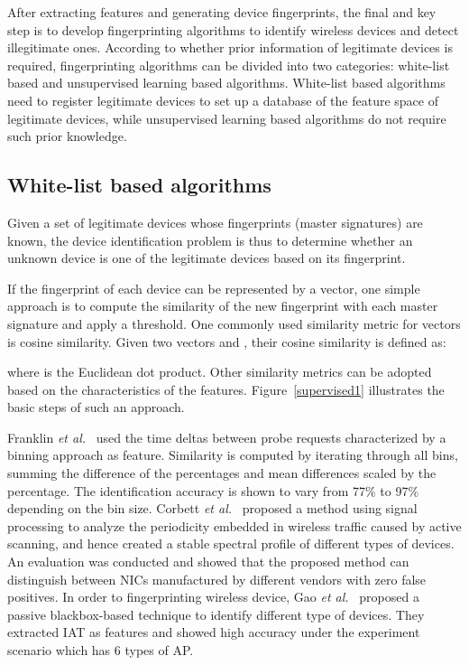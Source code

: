 \documentclass[journal,draftcls,onecolumn,11pt]{IEEEtran}
\newcounter{ctr}\setcounter{ctr}{0}
\begin{document}
After extracting features and generating device fingerprints, the final and key step is to develop fingerprinting algorithms to identify wireless devices and detect illegitimate ones.  According to whether prior information of legitimate devices is required, fingerprinting algorithms can be divided into two categories: white-list based  and unsupervised learning based algorithms.  White-list based algorithms need to register legitimate devices to set up a database of the feature space of legitimate devices, while unsupervised learning based algorithms do not require such prior knowledge.

\subsection{White-list based algorithms}

Given a set of legitimate devices whose fingerprints (master signatures) are known, the device identification problem is thus to determine whether an unknown device is one of the legitimate devices based on its fingerprint.

If the fingerprint of each device can be represented by a vector, one simple approach is to compute the similarity of the new fingerprint with each master signature and apply a threshold. One commonly used similarity metric for vectors is cosine similarity.  Given two vectors  and , their cosine similarity is defined as:

where  is the Euclidean dot product. Other similarity metrics can be adopted based on the characteristics of the features.  Figure~\ref{supervised1} illustrates the basic steps of such an approach.

Franklin {\it et al.}~\cite{Franklin} used the time deltas between probe requests characterized by a binning approach as feature. Similarity is computed by iterating through all bins, summing the difference of the percentages and mean differences scaled by the percentage. The identification accuracy is shown to vary from 77\% to 97\% depending on the bin size. Corbett \textit{et al.}~\cite{Corbett2008a} proposed a method using signal processing to analyze the periodicity embedded in wireless traffic caused by active scanning, and hence created a stable spectral profile of different types of devices. An evaluation was conducted and showed that the proposed method can distinguish between NICs manufactured by different vendors with zero false positives. In order to fingerprinting wireless device, Gao \textit{et al.}~\cite{Gao} proposed a passive blackbox-based technique to identify different type of devices. They extracted IAT as features and showed high accuracy under the experiment scenario which has 6 types of AP.
\end{document}
